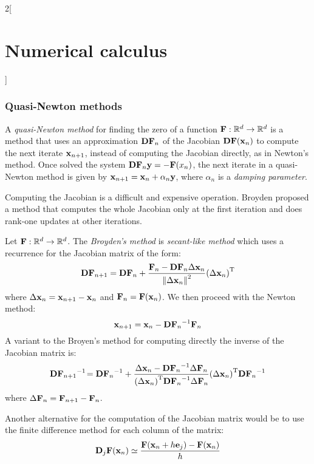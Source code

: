 \documentclass[../../../main_math.tex]{subfiles}
\begin{document}
\begin{multicols}{2}[\section{Numerical calculus}]
  \subsubsection{Quasi-Newton methods}
  \begin{definition}
    A \emph{quasi-Newton method} for finding the zero of a function $\boldsymbol{\mathrm{F}}:\mathbb{R}^d\rightarrow\mathbb{R}^d$ is a method that uses an approximation $\boldsymbol{\mathrm{DF}}_n$ of the Jacobian $\boldsymbol{\mathrm{DF}}(\boldsymbol{\mathrm{x}}_n)$ to compute the next iterate $\boldsymbol{\mathrm{x}}_{n+1}$, instead of computing the Jacobian directly, as in Newton's method. Once solved the system $\boldsymbol{\mathrm{DF}}_n\boldsymbol{\mathrm{y}} = -\boldsymbol{\mathrm{F}}(x_n)$, the next iterate in a quasi-Newton method is given by $\boldsymbol{\mathrm{x}}_{n+1}=\boldsymbol{\mathrm{x}}_n+\alpha_n\boldsymbol{\mathrm{y}}$, where $\alpha_n$ is a \emph{damping parameter}.
  \end{definition}
  \begin{remark}
    Computing the Jacobian is a difficult and expensive operation. Broyden proposed a method that computes the whole Jacobian only at the first iteration and does rank-one updates at other iterations.
  \end{remark}
  \begin{definition}
    Let $\boldsymbol{\mathrm{F}}:\mathbb{R}^d\rightarrow\mathbb{R}^d$. The \emph{Broyden's method} is \emph{secant-like method} which uses a recurrence for the Jacobian matrix of the form:
    $$
      \boldsymbol{\mathrm{DF}}_{n+1}=\boldsymbol{\mathrm{DF}}_n+\frac{\boldsymbol{\mathrm{F}}_n-\boldsymbol{\mathrm{DF}}_n\Delta\boldsymbol{\mathrm{x}}_n}{\left\|\Delta\boldsymbol{\mathrm{x}}_n\right\|^2}{(\Delta\boldsymbol{\mathrm{x}}_n)}^{\mathrm{T}}
    $$
    where $\Delta\boldsymbol{\mathrm{x}}_n=\boldsymbol{\mathrm{x}}_{n+1}-\boldsymbol{\mathrm{x}}_n$ and $\boldsymbol{\mathrm{F}}_n=\boldsymbol{\mathrm{F}}(\boldsymbol{\mathrm{x}}_n)$. We then proceed with the Newton method:
    $$
      \boldsymbol{\mathrm{x}}_{n+1}=\boldsymbol{\mathrm{x}}_n-{\boldsymbol{\mathrm{DF}}_{n}}^{-1}\boldsymbol{\mathrm{F}}_n
    $$
    A variant to the Broyen's method for computing directly the inverse of the Jacobian matrix is:
    $$
      {\boldsymbol{\mathrm{DF}}_{n+1}}^{-1}\!={\boldsymbol{\mathrm{DF}}_n}^{-1}+\frac{\Delta\boldsymbol{\mathrm{x}}_n-{\boldsymbol{\mathrm{DF}}_n}^{-1}\Delta\boldsymbol{\mathrm{F}}_n}{{(\Delta\boldsymbol{\mathrm{x}}_n)}^{\mathrm{T}}{\boldsymbol{\mathrm{DF}}_n}^{-1}\Delta\boldsymbol{\mathrm{F}}_n}{(\Delta\boldsymbol{\mathrm{x}}_n)}^{\mathrm{T}}{\boldsymbol{\mathrm{DF}}_n}^{-1}
    $$
    where $\Delta\boldsymbol{\mathrm{F}}_n=\boldsymbol{\mathrm{F}}_{n+1}-\boldsymbol{\mathrm{F}}_n$.
  \end{definition}
  \begin{remark}
    Another alternative for the computation of the Jacobian matrix would be to use the finite difference method for each column of the matrix:
    $$
      \boldsymbol{\mathrm{D}}_j\boldsymbol{\mathrm{F}}(\boldsymbol{\mathrm{x}}_n)\simeq\frac{\boldsymbol{\mathrm{F}}(\boldsymbol{\mathrm{x}}_n+h\boldsymbol{\mathrm{e}}_j)-\boldsymbol{\mathrm{F}}(\boldsymbol{\mathrm{x}}_n)}{h}
    $$
  \end{remark}

\end{multicols}
\end{document}
